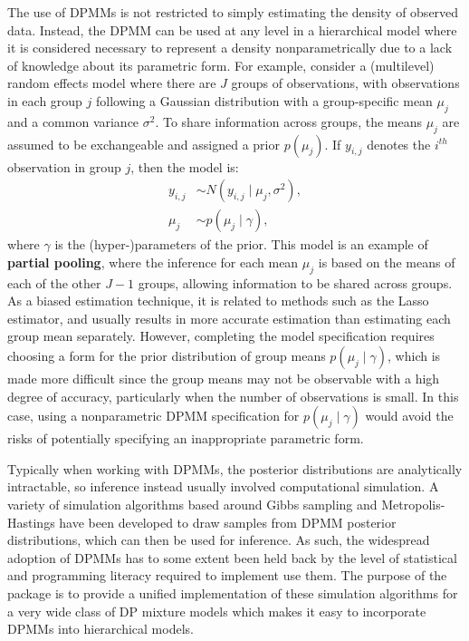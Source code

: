 \documentclass[nojss]{jss}
\begin{document}
The use of DPMMs is not restricted to simply estimating the density of observed data. Instead, the DPMM can be used at any level in a hierarchical model where it is considered necessary to represent a density nonparametrically due to a lack of knowledge about its parametric form. For example, consider a (multilevel) random effects model where there are $J$ groups of observations, with observations in each group $j$ following a Gaussian distribution with a group-specific mean $\mu_j$ and a common variance $\sigma^2$. To share information across groups, the means $\mu_j$ are assumed to be exchangeable and assigned a prior $p(\mu_j)$. If $y_{i,j}$ denotes the $i^{th}$ observation in group $j$, then the model is:
\begin{align*}
y_{i,j} & \sim N(y_{i,j} \mid \mu_j,\sigma^2), \\
\mu_j & \sim p(\mu_j \mid \gamma),
\end{align*}
where $\gamma$ is the (hyper-)parameters of the prior. This model is an example of \textbf{partial pooling}, where the inference for each mean $\mu_j$ is based on the means of each of the other $J-1$ groups, allowing information to be shared across groups. As a biased estimation technique, it is related to methods such as the Lasso estimator, and usually results in more accurate estimation than estimating each group mean separately. However, completing the model specification requires choosing a form for the prior distribution of group means $p(\mu_j \mid \gamma)$, which is made more difficult since the group means may not be observable with a high degree of accuracy, particularly when the number of observations is small. In this case, using a nonparametric DPMM specification for $p(\mu_j \mid \gamma) $ would avoid the risks of potentially specifying an inappropriate parametric form.

Typically when working with DPMMs, the posterior distributions are analytically intractable, so inference instead usually involved computational simulation. A variety of simulation algorithms based around Gibbs sampling and Metropolis-Hastings have been developed to draw samples from DPMM posterior distributions, which can then be used for inference. As such, the widespread adoption of DPMMs has to some extent been held back by the level of statistical and programming literacy required to implement use them. The purpose of the  package is to provide a unified implementation of these simulation algorithms for a very wide class of DP mixture models which makes it easy to incorporate DPMMs into hierarchical models.
\end{document}

